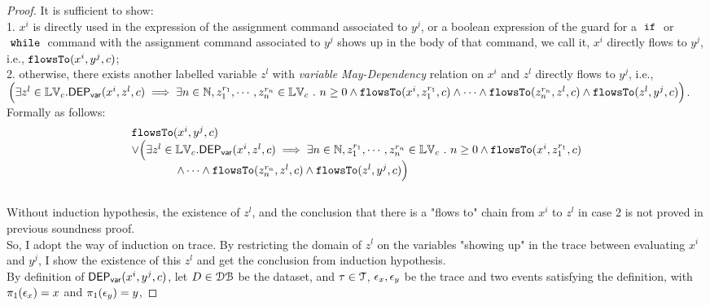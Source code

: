 \begin{proof}
  It is sufficient to show:
  \\
  1. $x^i$ is directly used in the expression of the assignment command associated to $y^j$, or a boolean
  expression of the guard for a $\;\mathtt{if}\;$ or $\;\mathtt{while}\;$ command with the assignment command associated to $y^j$ shows up in the body of that command, 
  we call it, $x^i$ directly flows to $y^j$,
  i.e.,
  $ \mathtt{flowsTo}(x^i, y^j, {c})$;
  \\
  2. otherwise, there exists another labelled variable $z^l$ with \emph{variable May-Dependency} relation on $x^i$ and 
  $z^l$ directly flows to $y^j$, i.e., 
  \\
  $\Big(
    \exists z^l \in \mathbb{LV}_{{c}}.
  \mathsf{DEP_{var}}(x^i, z^l, {c})   
  \implies
   \exists n \in \mathbb{N}, z_1^{r_1}, \cdots, z_n^{r_n} \in \mathbb{LV}_{{c}} ~.~ n \geq 0 \land
  \mathtt{flowsTo}(x^i,  z_1^{r_1}, c) 
  \land \cdots \land \mathtt{flowsTo}(z_n^{r_n}, z^l, c) 
  \land  \mathtt{flowsTo}(z^l, y^j, {c})
  \Big)$.
%
\\ Formally as follows:
\[
  \begin{array}{l}
    \mathtt{flowsTo}(x^i, y^j, {c})
    \\
    \lor 
    \Big(
      \exists z^l \in \mathbb{LV}_{{c}}.
    \mathsf{DEP_{var}}(x^i, z^l, {c})   
  \implies
     \exists n \in \mathbb{N}, z_1^{r_1}, \cdots, z_n^{r_n} \in \mathbb{LV}_{{c}} ~.~ n \geq 0 \land
    \mathtt{flowsTo}(x^i,  z_1^{r_1}, c) 
    \\ \qquad \qquad 
    \land \cdots  \land \mathtt{flowsTo}(z_n^{r_n}, z^l, c) 
    \land  \mathtt{flowsTo}(z^l, y^j, {c})
    \Big)
  \end{array}
  \]
\\
%
Without induction hypothesis, the existence of $z^l$, and the conclusion that there is a "flows to" chain from $x^i$ to $z^l$ in case 2 is not proved in previous soundness proof.
\\
%
So, I adopt the way of induction on trace.
By restricting the domain of $z^l$ on the variables "showing up" in the 
trace between evaluating $x^i$ and $y^j$, I show the existence of this $z^l$ and get the conclusion from induction hypothesis. 
\\
    By definition of $\mathsf{DEP_{var}}(x^i, y^j, {c})$, 
let $D \in \mathcal{DB}$ be the dataset,
and $\mathtt{\tau} \in \mathcal{T}$, $\mathtt{\epsilon}_x, \mathtt{\epsilon}_y$ be the trace and two events satisfying the definition, 
with $\pi_1(\mathtt{\epsilon}_x) = x$ and $\pi_1(\mathtt{\epsilon}_y) = y$,

\end{proof}
